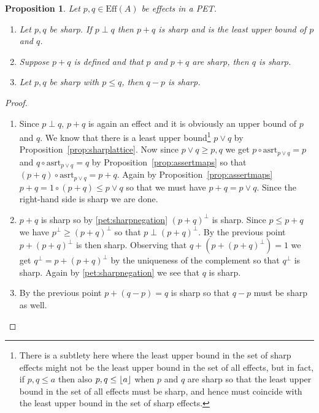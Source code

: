 \documentclass[b5paper,onecolumn,12pt,accepted=2019-05-03, issue=1, volume=1, shorttitle=papers/compositionality-1-1]{compositionalityarticle}
\DeclarePairedDelimiter{\floor}{\lfloor}{\rfloor}
\newcounter{counter}
\numberwithin{counter}{section}
\newtheorem{proposition}[counter]{Proposition}
\newcommand{\asrt}{\text{asrt}}
\newcommand{\pred}{\text{Eff}}
\begin{document}


\begin{proposition}\label{prop:sharpadd}
	Let $p,q\in \pred(A)$ be effects in a PET.
	\begin{enumerate}
		\item Let $p,q$ be sharp. If $p\perp q$ then $p+q$ is sharp and is the least upper bound of $p$ and $q$.
		\item Suppose $p+q$ is defined and that $p$ and $p+q$ are sharp, then $q$ is sharp.
		\item Let $p,q$ be sharp with $p\leq q$, then $q-p$ is sharp.
	\end{enumerate}
\end{proposition}
\begin{proof}~
\begin{enumerate}
	\item Since $p\perp q$, $p+q$ is again an effect and it is obviously an upper bound of $p$ and $q$. We know that there is a least upper bound\footnote{There is a subtlety here where the least upper bound in the set of sharp effects might not be the least upper bound in the set of all effects, but in fact, if $p,q\leq a$ then also $p,q\leq \floor{a}$ when $p$ and $q$ are sharp so that the least upper bound in the set of all effects must be sharp, and hence must coincide with the least upper bound in the set of sharp effects.} $p\vee q$ by Proposition~\ref{prop:sharplattice}. Now since $p\vee q\geq p,q$ we get $p\circ\asrt_{p\vee q}=p$ and $q\circ\asrt_{p\vee q} = q$ by Proposition~\ref{prop:assertmaps} so that $(p+q)\circ\asrt_{p\vee q} = p+q$. Again by Proposition~\ref{prop:assertmaps} $p+q = 1\circ(p+q)\leq p\vee q$ so that we must have $p+q = p\vee q$. Since the right-hand side is sharp we are done.
	\item $p+q$ is sharp so by \ref{pet:sharpnegation} $(p+q)^\perp$ is sharp. Since $p\leq p+q$ we have $p^\perp\geq (p+q)^\perp$ so that $p\perp (p+q)^\perp$. By the previous point $p+(p+q)^\perp$ is then sharp. Observing that $q+ (p+(p+q)^\perp) = 1$ we get $q^\perp = p+(p+q)^\perp$ by the uniqueness of the complement so that $q^\perp$ is sharp. Again by \ref{pet:sharpnegation} we see that $q$ is sharp.
	\item By the previous point $p+ (q-p) = q$ is sharp so that $q-p$ must be sharp as well. \qedhere
\end{enumerate}
\end{proof}
\end{document}
